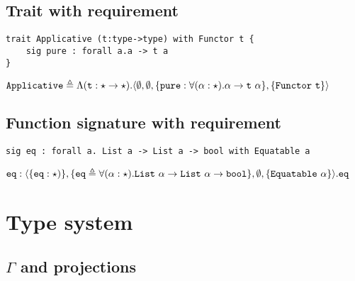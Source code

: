 \documentclass{article}[11pt]
\newcommand{\term}[1]{\verb~#1~}
\begin{document}
    \subsection{Trait with requirement}\label{subsec:trait-with-requirement}

    \begin{verbatim}
trait Applicative (t:type->type) with Functor t {
    sig pure : forall a.a -> t a
}
    \end{verbatim}

    \noindent
    \begin{math}
        \term{Applicative} \triangleq \Lambda(\term{t}:\star \rightarrow \star).
        \langle
        \emptyset,
        \emptyset,
        \{ \term{pure} : \forall(\alpha:\star).\alpha \rightarrow \term{t}~\alpha \},
        \{ \term{Functor}~\term{t} \}
        \rangle
    \end{math}

    \subsection{Function signature with requirement}\label{subsec:function-signature-with-requirement}

    \begin{verbatim}
sig eq : forall a. List a -> List a -> bool with Equatable a
    \end{verbatim}

    \noindent
    \begin{math}
        \term{eq} : \langle
        \{ \term{eq} : \star)\},
        \{ \term{eq} \triangleq \forall(\alpha:\star).\term{List}~\alpha \rightarrow \term{List}~\alpha \rightarrow \term{bool} \},
        \emptyset,
        \{ \term{Equatable} ~ \alpha \}
        \rangle.\term{eq}
    \end{math}


    \section{Type system}\label{sec:type-system}

    \subsection{$\Gamma$ and projections}\label{subsec:$gamma$-projections-and-extraction}
\end{document}
